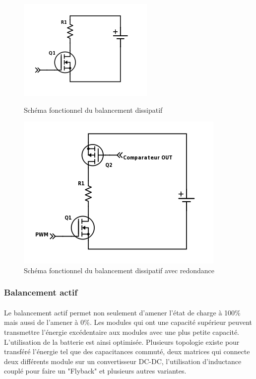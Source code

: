 \begin{figure}[H]
	\begin{minipage}{0.5\textwidth}
		\centering
		\includegraphics[scale=0.9]{Images/Dissipative_balancing.png}
		\caption{Schéma fonctionnel du balancement dissipatif}
		\label{fig:bal_dis}
	\end{minipage}
	\hfill
	\begin{minipage}{0.45\textwidth}
		\centering
		\includegraphics[scale=0.6]{Images/Dissipative_bal_comp.png}
		\caption{Schéma fonctionnel du balancement dissipatif avec redondance}
		\label{fig:bal_dis_comp}
	\end{minipage}	
\end{figure}

\subsubsection*{Balancement actif}
\paragraph*{}
Le balancement actif permet non seulement d'amener l'état de charge à 100\% mais aussi de l'amener à 0\%. Les modules qui ont une capacité supérieur peuvent transmettre l'énergie excédentaire aux modules avec une plus petite capacité. L'utilisation de la batterie est ainsi optimisée. Plusieurs topologie existe pour transféré l'énergie tel que des capacitances commuté, deux matrices qui connecte deux différents module sur un convertisseur DC-DC, l'utilisation d'inductance couplé pour faire un "Flyback" et plusieurs autres variantes. 

